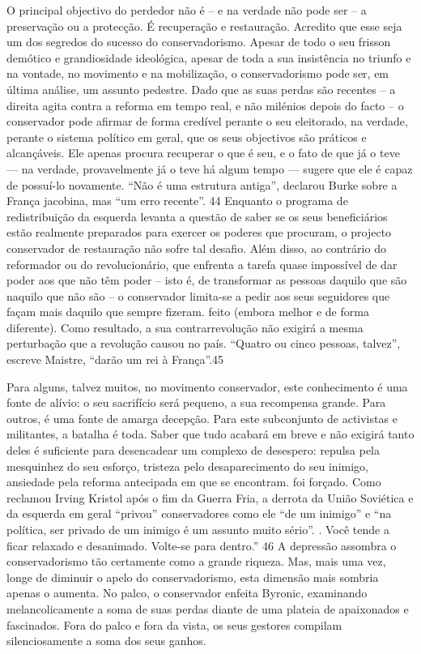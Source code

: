 O principal objectivo do perdedor não é – e na verdade não pode ser – a preservação ou a protecção. É recuperação e restauração. Acredito que esse seja um dos segredos do sucesso do conservadorismo. Apesar de todo o seu frisson demótico e grandiosidade ideológica, apesar de toda a sua insistência no triunfo e na vontade, no movimento e na mobilização, o conservadorismo pode ser, em última análise, um assunto pedestre. Dado que as suas perdas são recentes – a direita agita contra a reforma em tempo real, e não milénios depois do facto – o conservador pode afirmar de forma credível perante o seu eleitorado, na verdade, perante o sistema político em geral, que os seus objectivos são práticos e alcançáveis. Ele apenas procura recuperar o que é seu, e o fato de que já o teve — na verdade, provavelmente já o teve há algum tempo — sugere que ele é capaz de possuí-lo novamente. “Não é uma estrutura antiga”, declarou Burke sobre a França jacobina, mas “um erro recente”. {\color{blue}44} Enquanto o programa de redistribuição da esquerda levanta a questão de saber se os seus beneficiários estão realmente preparados para exercer os poderes que procuram, o projecto conservador de restauração não sofre tal desafio. Além disso, ao contrário do reformador ou do revolucionário, que enfrenta a tarefa quase impossível de dar poder aos que não têm poder – isto é, de transformar as pessoas daquilo que são naquilo que não são – o conservador limita-se a pedir aos seus seguidores que façam mais daquilo que sempre fizeram. feito (embora melhor e de forma diferente). Como resultado, a sua contrarrevolução não exigirá a mesma perturbação que a revolução causou no país. “Quatro ou cinco pessoas, talvez”, escreve Maistre, “darão um rei à França”.{\color{blue}45}
 \par 
Para alguns, talvez muitos, no movimento conservador, este conhecimento é uma fonte de alívio: o seu sacrifício será pequeno, a sua recompensa grande. Para outros, é uma fonte de amarga decepção. Para este subconjunto de activistas e militantes, a batalha é toda. Saber que tudo acabará em breve e não exigirá tanto deles é suficiente para desencadear um complexo de desespero: repulsa pela mesquinhez do seu esforço, tristeza pelo desaparecimento do seu inimigo, ansiedade pela reforma antecipada em que se encontram. foi forçado. Como reclamou Irving Kristol após o fim da Guerra Fria, a derrota da União Soviética e da esquerda em geral “privou” conservadores como ele “de um inimigo” e “na política, ser privado de um inimigo é um assunto muito sério”. . Você tende a ficar relaxado e desanimado. Volte-se para dentro.” {\color{blue}46} A depressão assombra o conservadorismo tão certamente como a grande riqueza. Mas, mais uma vez, longe de diminuir o apelo do conservadorismo, esta dimensão mais sombria apenas o aumenta. No palco, o conservador enfeita Byronic, examinando melancolicamente a soma de suas perdas diante de uma plateia de apaixonados e fascinados. Fora do palco e fora da vista, os seus gestores compilam silenciosamente a soma dos seus ganhos.